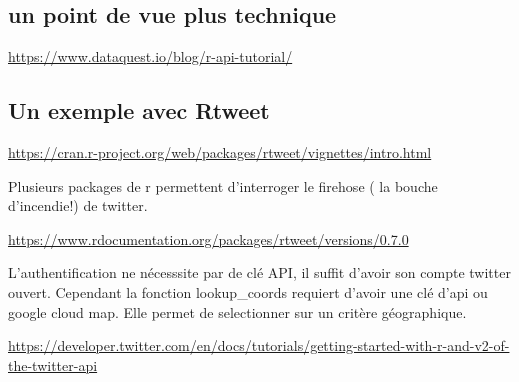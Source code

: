 \documentclass[
]{book}
\begin{document}
\hypertarget{un-point-de-vue-plus-technique}{%
\subsection{un point de vue plus technique}\label{un-point-de-vue-plus-technique}}

\url{https://www.dataquest.io/blog/r-api-tutorial/}

\hypertarget{un-exemple-avec-rtweet}{%
\subsection{Un exemple avec Rtweet}\label{un-exemple-avec-rtweet}}

\url{https://cran.r-project.org/web/packages/rtweet/vignettes/intro.html}

Plusieurs packages de r permettent d'interroger le firehose ( la bouche d'incendie!) de twitter.

\url{https://www.rdocumentation.org/packages/rtweet/versions/0.7.0}

L'authentification ne nécesssite par de clé API, il suffit d'avoir son compte twitter ouvert. Cependant la fonction lookup\_coords requiert d'avoir une clé d'api ou google cloud map. Elle permet de selectionner sur un critère géographique.

\url{https://developer.twitter.com/en/docs/tutorials/getting-started-with-r-and-v2-of-the-twitter-api}
\end{document}
